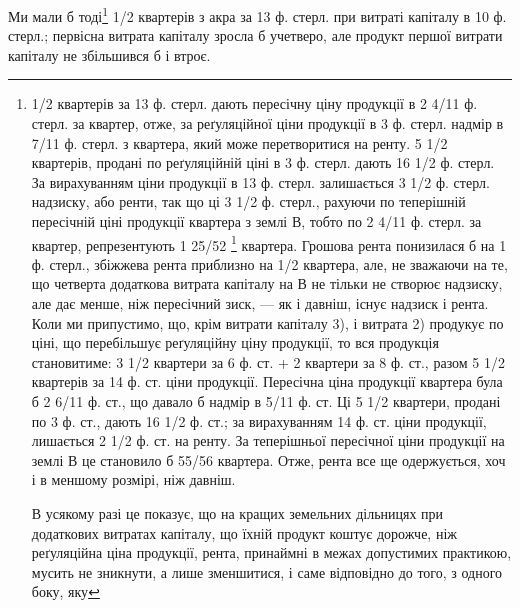 Ми мали б тоді\footnote{
1/2 квартерів за 13 ф. стерл. дають пересічну ціну продукції в 2 4/11 ф. стерл.
за квартер, отже, за реґуляційної ціни продукції в 3 ф. стерл. надмір
в 7/11 ф. стерл. з квартера, який може перетворитися на ренту. 5 1/2 квартерів,
продані по реґуляційній ціні в 3 ф. стерл. дають 16 1/2 ф. стерл. За вирахуванням
ціни продукції в 13 ф. стерл. залишається 3 1/2 ф. стерл. надзиску, або
ренти, так що ці 3 1/2 ф. стерл., рахуючи по теперішній пересічній ціні продукції
квартера з землі В, тобто по 2 4/11 ф. стерл. за квартер, репрезентують
1 25/52 \footnote*{
В німецькому тексті тут стоїть: «1 5/72». Очевидна помилка. Прим. Ред.
} квартера. Грошова рента понизилася б на 1 ф. стерл., збіжжева
рента приблизно на 1/2 квартера, але, не зважаючи на те, що четверта додаткова
витрата капіталу на В не тільки не створює надзиску, але дає менше, ніж
пересічний зиск, — як і давніш, існує надзиск і рента. Коли ми припустимо, що,
крім витрати капіталу 3), і витрата 2) продукує по ціні, що перебільшує реґуляційну
ціну продукції, то вся продукція становитиме: 3 1/2 квартери за
6 ф. ст. + 2 квартери за 8 ф. ст., разом 5 1/2 квартерів за 14 ф. ст. ціни продукції.
Пересічна ціна продукції квартера була б 2 6/11  ф. ст., що давало б надмір
в 5/11 ф. ст. Ці  5 1/2  квартери, продані по 3 ф. ст., дають 16 1/2 ф. ст.; за вирахуванням
14 ф. ст. ціни продукції, лишається 2 1/2 ф. ст. на ренту. За теперішньої
пересічної ціни продукції на землі В це становило б 55/56 квартера. Отже, рента
все ще одержується, хоч і в меншому розмірі, ніж давніш.

В усякому разі це показує, що на кращих земельних дільницях при додаткових
витратах капіталу, що їхній продукт коштує дорожче, ніж реґуляційна
ціна продукції, рента, принаймні в межах допустимих практикою, мусить не
зникнути, а лише зменшитися, і саме відповідно до того, з одного боку, яку
} 1/2  квартерів з акра за 13 ф. стерл. при витраті капіталу
в 10 ф. стерл.; первісна витрата капіталу зросла б учетверо, але продукт
першої витрати капіталу не збільшився б і втроє.